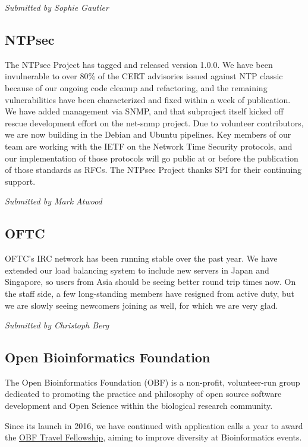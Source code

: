 \documentclass[a4paper]{report}
\begin{document}
{\em Submitted by Sophie Gautier}

\subsection{NTPsec}

The NTPsec Project has tagged and released version 1.0.0.  We have been
invulnerable to over 80\% of the CERT advisories issued against NTP
classic because of our ongoing code cleanup and refactoring, and the
remaining vulnerabilities have been characterized and fixed within a
week of publication.   We have added management via SNMP, and that
subproject itself kicked off rescue development effort on the net-snmp
project.  Due to volunteer contributors, we are now building in the
Debian and Ubuntu pipelines.  Key members of our team are working with
the IETF on the Network Time Security protocols, and our implementation
of those protocols will go public at or before the publication of those
standards as RFCs.  The NTPsec Project thanks SPI for their continuing
support.

{\em Submitted by Mark Atwood}

\subsection{OFTC}

OFTC's IRC network has been running stable over the past year. We have
extended our load balancing system to include new servers in Japan and
Singapore, so users from Asia should be seeing better round trip times
now. On the staff side, a few long-standing members have resigned from
active duty, but we are slowly seeing newcomers joining as well, for
which we are very glad.

{\em Submitted by Christoph Berg}

\subsection{Open Bioinformatics Foundation}

The Open Bioinformatics Foundation (OBF) is a non-profit, volunteer-run
group dedicated to promoting the practice and philosophy of open source
software development and Open Science within the biological research
community.

Since its launch in 2016, we have continued with application calls a
year to award the
\href{https://news.open-bio.org/2016/03/01/obf-travel-fellowship-program/}{OBF
Travel Fellowship}, aiming to improve diversity at Bioinformatics
events.
\end{document}
